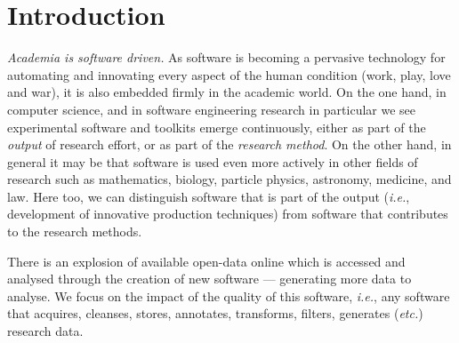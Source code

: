 \documentclass[a4paper,UKenglish]{dagman}
\renewcommand{\paragraph}[1]{\subsubsection*{#1}\xspace}
\newcommand{\ie}{\emph{i.e.},\xspace}
\newcommand{\etc}{\emph{etc.}\xspace}
\begin{document}
%



\tableofcontents

\section{Introduction}

\emph{Academia is software driven.} As software is becoming a pervasive technology for automating and innovating every aspect of the human condition (work, play, love and war), it is also embedded firmly in the academic world. On the one hand, in computer science, and in software engineering research in particular we see experimental software and toolkits emerge continuously, either as part of the \emph{output} of research effort, or as part of the \emph{research method}. On the other hand, in general it may be that software is used even more actively in other fields of research such as mathematics, biology, particle physics, astronomy, medicine, and law. Here too, we can distinguish software that is part of the output (\ie development of innovative production techniques) from software that contributes to the research methods. 

There is an explosion of available open-data online which is accessed and analysed through the creation of new software --- generating more data to analyse. We focus on the impact of the quality of this software, \ie any software that acquires, cleanses, stores, annotates, transforms, filters, generates (\etc) research data.
\end{document}
